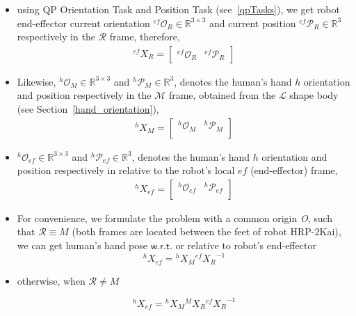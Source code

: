 \documentclass[a4paper, 12pt, oneside]{Thesis}  %
\begin{document}
\begin{itemize}
	\item using QP Orientation Task and Position Task (see~\ref{qpTasks}), we get robot end-effector current orientation ${{}^{ef}\mathcal{O}_R} \in \mathbb{R}^{3\times3}$ and current position ${{}^{ef}\mathcal{P}_R} \in \mathbb{R}^{3}$ respectively in the $\mathcal{R}$ frame, therefore,
	\begin{gather}\label{X_R_ef}
		{}^{ef}{X}_R =
		\left[\begin{array}{cc}
		{}^{ef}\mathcal{O}_R & {}^{ef}\mathcal{P}_R
		\end{array}\right]
	\end{gather}
	
	\item Likewise, ${{}^{h}\mathcal{O}_M} \in \mathbb{R}^{3\times3}$ and ${{}^{h}\mathcal{P}_M} \in \mathbb{R}^{3}$, denotes the human's hand $h$ orientation and position respectively in the $\mathcal{M}$ frame, obtained from the $\mathcal{L}$ shape body (see Section~\ref{hand_orientation}),
	\begin{gather}\label{X_M_h}
		{}^{h}{X}_M =
		\left[\begin{array}{cc}
		{}^{h}\mathcal{O}_M & {}^{h}\mathcal{P}_M \\
		\end{array}\right]
	\end{gather}

	\item ${{}^{h}\mathcal{O}_{ef}} \in \mathbb{R}^{3\times3}$ and ${{}^{h}\mathcal{P}_{ef}} \in \mathbb{R}^{3}$, denotes the human's hand $h$ orientation and position respectively in relative to the robot's local $ef$ (end-effector) frame,
	\begin{gather}\label{X_ef_h}
		{}^{h}{X}_{ef} =
		\left[\begin{array}{cc}
		{}^{h}\mathcal{O}_{ef} & {}^{h}\mathcal{P}_{ef} \\
		\end{array}\right]
	\end{gather}
	
	\item For convenience, we formulate the problem with a common origin {\it O}, such that $\mathcal R \equiv M$ (both frames are located between the feet of robot HRP-2Kai), we can get human's hand pose $\mathsf{w.r.t.}$ or relative to robot's end-effector
%	
	\begin{equation}\label{X_ef_h1}
		{}^{h}{X}_{ef} = {}^{h}{X}_{M}  {}^{ef}{X_{R}}^{-1}
	\end{equation}
	\item otherwise, when $\mathcal R \neq M$

	\begin{equation}\label{X_ef_h2}
	{}^{h}{X}_{ef} = {}^{h}{X}_{M}  {}^{M}{X}_R  {}^{ef}{X_{R}}^{-1}
	\end{equation}
	
\end{itemize}
\end{document}
